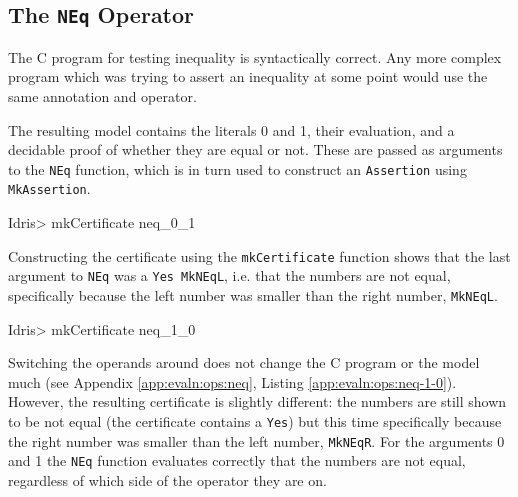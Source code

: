     \subsection{The \texttt{NEq} Operator}\label{evaln:ops:neq}
        
        
        The C program for testing inequality is syntactically correct. Any more complex program which was trying to assert an inequality at some point would use the same annotation and operator.
        
        \newpage
        
        
        The resulting \Idris model contains the literals 0 and 1, their evaluation, and a decidable proof of whether they are equal or not. These are passed as arguments to the \texttt{NEq} function, which is in turn used to construct an \texttt{Assertion} using \texttt{MkAssertion}.
        
        \begin{code}
Idris> mkCertificate neq_0_1
        \end{code}
        
        Constructing the certificate using the \texttt{mkCertificate} function shows that the last argument to \texttt{NEq} was a \texttt{Yes MkNEqL}, i.e. that the numbers are not equal, specifically because the left number was smaller than the right number, \texttt{MkNEqL}.
        
        \newpage
        
        \begin{code}
Idris> mkCertificate neq_1_0
        \end{code}
        
        Switching the operands around does not change the C program or the model much (see Appendix \ref{app:evaln:ops:neq}, Listing \ref{app:evaln:ops:neq-1-0}). However, the resulting certificate is slightly different: the numbers are still shown to be not equal (the certificate contains a \texttt{Yes}) but this time specifically because the right number was smaller than the left number, \texttt{MkNEqR}.
        For the arguments 0 and 1 the \texttt{NEq} function evaluates correctly that the numbers are not equal, regardless of which side of the operator they are on.
        
